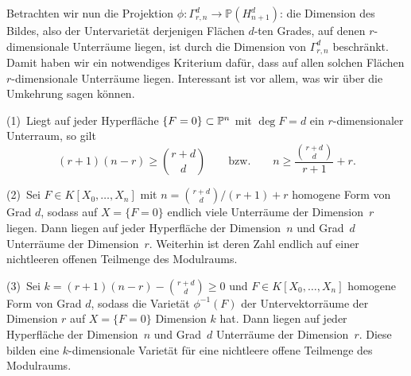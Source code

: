 Betrachten wir nun die Projektion $\phi \colon \Gamma_{r,n}^d \to \mathbb P(H_{n+1}^d)$: die Dimension des Bildes, also der Untervarietät derjenigen Flächen $d$-ten Grades, auf denen $r$-dimensionale Unterräume liegen, ist durch die Dimension von $\Gamma_{r,n}^d$ beschränkt. Damit haben wir ein notwendiges Kriterium dafür, dass auf allen solchen Flächen $r$-dimensionale Unterräume liegen. Interessant ist vor allem, was wir über die Umkehrung sagen können.

\begin{theorem}
(1)~Liegt auf jeder Hyperfläche $\{F = 0\} \subset \mathbb P^{n}$ mit $\deg F = d$ ein $r$-dimensionaler Unterraum, so gilt
\begin{equation}
(r+1)(n-r) \geq \binom{r+d}d \qquad\text{bzw.}\qquad n \geq \frac{\binom{r+d}d}{r+1} + r.
\end{equation}

(2)~Sei $F \in K[X_0, \dots, X_n]$ mit $n = \binom{r+d}d / (r+1) + r$ homogene Form von Grad $d$, sodass auf $X = \{F = 0\}$ endlich viele Unterräume der Dimension~$r$ liegen. Dann liegen auf jeder Hyperfläche der Dimension~$n$ und Grad~$d$ Unterräume der Dimension~$r$. Weiterhin ist deren Zahl endlich auf einer nichtleeren offenen Teilmenge des Modulraums.

(3)~Sei $k = (r+1)(n-r) - \binom{r+d}d \geq 0$ und $F \in K[X_0, \dots, X_n]$ homogene Form von Grad $d$, sodass die Varietät $\phi^{-1}(F)$ der Untervektorräume der Dimension $r$ auf $X = \{F = 0\}$ Dimension $k$ hat. Dann liegen auf jeder Hyperfläche der Dimension~$n$ und Grad~$d$ Unterräume der Dimension~$r$. Diese bilden eine $k$-dimensionale Varietät für eine nichtleere offene Teilmenge des Modulraums.
\end{theorem}
